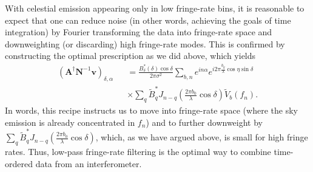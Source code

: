 \documentclass[twocolumn,apj,numberedappendix]{emulateapj}
\newcommand{\vis}{\mathbf{v}}
\newcommand{\A}{\mathbf{A}}
\newcommand{\N}{\mathbf{N}}
\begin{document}
With celestial emission appearing only in low fringe-rate bins, it is
reasonable to expect that one can reduce noise (in other words, achieving the
goals of time integration) by Fourier transforming the data into fringe-rate
space and downweighting (or discarding) high fringe-rate modes.  This is
confirmed by constructing the optimal prescription as we did above, which
yields
\begin{eqnarray}
\label{eq:AdagNinvv}
\left( \A^\dagger \N^{-1} \vis \right)_{\delta,\alpha} && = \frac{B_\delta^* (\delta)  \cos \delta}{2\pi \sigma^2} \sum_{b,n} e^{i n \alpha} e^{i 2 \pi  \frac{b_y}{\lambda} \cos \eta \sin \delta} \nonumber \\
&& \times \sum_{q} \widetilde{B}_q^* J_{n-q} \left( \frac{2 \pi b_0}{\lambda} \cos \delta \right) \widetilde{V}_b (f_n).
\end{eqnarray}
In words, this recipe instructs us to move into fringe-rate space (where the
sky emission is already concentrated in $f_n$) and to further downweight by
$\sum_{q} \widetilde{B}_q^* J_{n-q} \left( \frac{2 \pi b_0}{\lambda} \cos \delta \right)$, which, as we have argued above, is small for high fringe
rates.  Thus, low-pass fringe-rate filtering is the optimal way to combine
time-ordered data from an interferometer.
\end{document}
